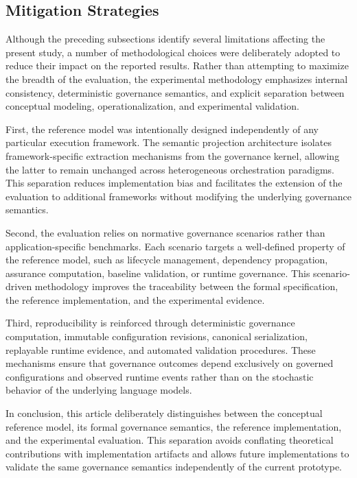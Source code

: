 \documentclass[10pt]{article}
\begin{document}
\subsection{Mitigation Strategies}
\label{sec:mitigation_strategies}

Although the preceding subsections identify several limitations affecting the present study, a number of methodological choices were deliberately adopted to reduce their impact on the reported results. Rather than attempting to maximize the breadth of the evaluation, the experimental methodology emphasizes internal consistency, deterministic governance semantics, and explicit separation between conceptual modeling, operationalization, and experimental validation.

First, the reference model was intentionally designed independently of any particular execution framework. The semantic projection architecture isolates framework-specific extraction mechanisms from the governance kernel, allowing the latter to remain unchanged across heterogeneous orchestration paradigms. This separation reduces implementation bias and facilitates the extension of the evaluation to additional frameworks without modifying the underlying governance semantics.

Second, the evaluation relies on normative governance scenarios rather than application-specific benchmarks. Each scenario targets a well-defined property of the reference model, such as lifecycle management, dependency propagation, assurance computation, baseline validation, or runtime governance. This scenario-driven methodology improves the traceability between the formal specification, the reference implementation, and the experimental evidence.

Third, reproducibility is reinforced through deterministic governance computation, immutable configuration revisions, canonical serialization, replayable runtime evidence, and automated validation procedures. These mechanisms ensure that governance outcomes depend exclusively on governed configurations and observed runtime events rather than on the stochastic behavior of the underlying language models.

In conclusion, this article deliberately distinguishes between the conceptual reference model, its formal governance semantics, the reference implementation, and the experimental evaluation. This separation avoids conflating theoretical contributions with implementation artifacts and allows future implementations to validate the same governance semantics independently of the current prototype.
\end{document}
